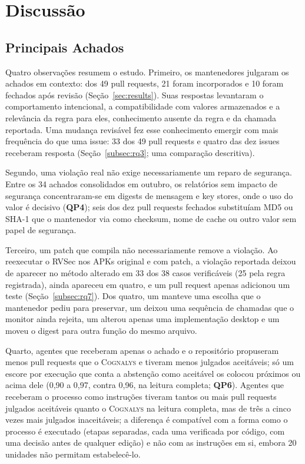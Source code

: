 \documentclass[conference]{IEEEtran}
\newcommand{\system}{\textsc{Cognalys}}
\newcommand{\researchq}[1]{\textbf{QP#1}}
\begin{document}
\section{Discussão}
\label{sec:discussion}

\subsection{Principais Achados}

Quatro observações resumem o estudo. Primeiro, os mantenedores julgaram os achados em
contexto: dos 49 pull requests, 21 foram incorporados e 10 foram fechados após
revisão (Seção~\ref{sec:results}). Suas respostas levantaram o comportamento
intencional, a compatibilidade com valores armazenados e a relevância da regra
para eles, conhecimento ausente da regra e da chamada reportada. Uma mudança revisável fez
esse conhecimento emergir com mais frequência do que uma issue: 33 dos 49 pull
requests e quatro das dez issues receberam resposta (Seção~\ref{subsec:rq3}; uma
comparação descritiva).

Segundo, uma violação real não exige necessariamente um reparo de segurança. Entre os 34
achados consolidados em outubro, os relatórios sem impacto de segurança concentraram-se
em digests de mensagem e key stores, onde o uso do valor é decisivo
(\researchq{4}); seis dos dez pull requests fechados substituíam MD5 ou SHA-1 que
o mantenedor via como checksum, nome de cache ou outro valor sem
papel de segurança.

Terceiro, um patch que compila não necessariamente remove a violação.
Ao reexecutar o RVSec nos APKs original e com patch, a violação reportada deixou
de aparecer no método alterado em 33 dos 38 casos verificáveis
(25 pela regra registrada), ainda apareceu em quatro, e um pull request apenas adicionou um teste
(Seção~\ref{subsec:rq7}). Dos quatro, um manteve uma escolha que o mantenedor pediu
para preservar, um deixou uma sequência de chamadas que o monitor ainda rejeita, um alterou
apenas uma implementação desktop e um moveu o digest para outra função do
mesmo arquivo.

Quarto, agentes que receberam apenas o achado e o repositório propuseram menos pull
requests que o \system{} e tiveram menos julgados aceitáveis; só um escore por
execução que conta a abstenção como aceitável os colocou próximos ou acima dele (0,90 a
0,97, contra 0,96, na leitura completa; \researchq{6}). Agentes que receberam o processo como
instruções tiveram tantos ou mais pull requests julgados aceitáveis quanto o
\system{} na leitura completa, mas de três a cinco vezes mais julgados inaceitáveis; a diferença é compatível com a forma como o
processo é executado (etapas separadas, cada uma verificada por código, com uma decisão
antes de qualquer edição) e não com as instruções em si, embora 20 unidades não
permitam estabelecê-lo.
\end{document}
